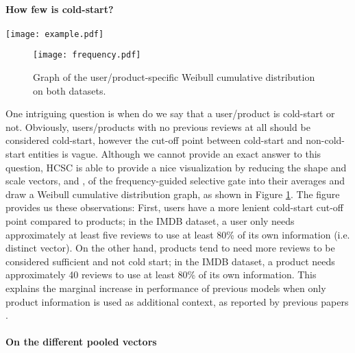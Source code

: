 \documentclass[11pt,a4paper]{article}
\begin{document}
\paragraph{How few is cold-start?}

\begin{figure*}[t]
    \centering
    \texttt{[image: example.pdf]}
    \caption{Visualization of attention and gate values of two examples from the Yelp 2013 dataset. Example 2 is truncated, leaving only the important parts. Gate values 's are the average of the values in the original gate vector.}
    \label{fig:examples}
\end{figure*}

\begin{figure}[t]
    \centering
    \texttt{[image: frequency.pdf]}
    \caption{Graph of the user/product-specific Weibull cumulative distribution on both datasets.}
    \label{fig:weibull}
\end{figure}

One intriguing question is when do we say that a user/product is cold-start or not. Obviously, users/products with no previous reviews at all should be considered cold-start, however the cut-off point between cold-start and non-cold-start entities is vague. Although we cannot provide an exact answer to this question, HCSC is able to provide a nice visualization by reducing the shape and scale vectors,  and , of the frequency-guided selective gate into their averages and draw a Weibull cumulative distribution graph, as shown in Figure \ref{fig:weibull}. The figure provides us these observations: First, users have a more lenient cold-start cut-off point compared to products; in the IMDB dataset, a user only needs approximately at least five reviews to use at least 80\% of its own information (i.e. distinct vector). On the other hand, products tend to need more reviews to be considered sufficient and not cold start; in the IMDB dataset, a product needs approximately 40 reviews to use at least 80\% of its own information. This explains the marginal increase in performance of previous models when only product information is used as additional context, as reported by previous papers \cite{tang2015learning,chen2016neural}.

\paragraph{On the different pooled vectors}
\end{document}
